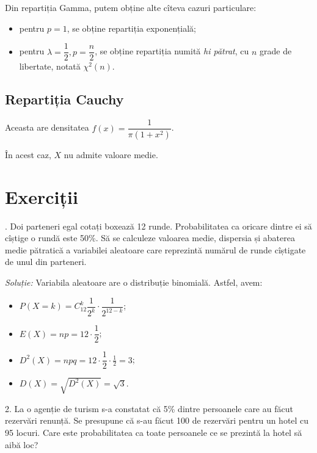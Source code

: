 Din repartiția Gamma, putem obține alte cîteva cazuri particulare:
\begin{itemize}
\item pentru $ p = 1 $, se obține repartiția exponențială;
\item pentru $ \lambda = \dfrac{1}{2}, p = \dfrac{n}{2} $, se obține
  repartiția numită \emph{hi pătrat}, cu $ n $ grade de libertate,
  notată $ \chi^2(n) $.
\end{itemize}


\subsection{Repartiția Cauchy}

\indent\indent Aceasta are densitatea $ f(x) = \dfrac{1}{\pi(1 + x^2)} $.

În acest caz, $ X $ nu admite valoare medie.


\section{Exerciții}

\indent{}. Doi parteneri egal cotați boxează 12 runde. Probabilitatea
ca oricare dintre ei să cîștige o rundă este 50\%. Să se calculeze valoarea
medie, dispersia și abaterea medie pătratică a variabilei aleatoare care
reprezintă numărul de runde cîștigate de unul din parteneri.

\emph{Soluție:} Variabila aleatoare are o distribuție binomială.
Astfel, avem:
\begin{itemize}
\item $ P(X = k) = C_{12}^k \dfrac{1}{2^k} \cdot \dfrac{1}{2^{12-k}} $;
\item $ E(X) = np = 12 \cdot \dfrac{1}{2} $;
\item $ D^2(X) = npq = 12 \cdot \dfrac{1}{2} \cdot \frac{1}{2} = 3 $;
\item $ D(X) = \sqrt{D^2(X)} = \sqrt{3} $.
\end{itemize}

\vspace{0.3cm}

2. La o agenție de turism s-a constatat că 5\% dintre persoanele care au făcut
rezervări renunță. Se presupune că s-au făcut 100 de rezervări pentru un hotel cu
95 locuri. Care este probabilitatea ca toate persoanele ce se prezintă la hotel
să aibă loc?

